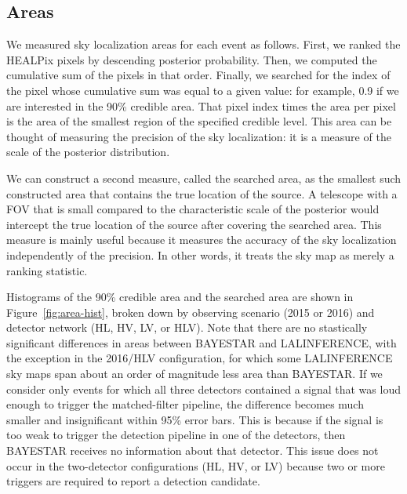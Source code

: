 \documentclass[amsmath,amssymb,aps,prx,reprint,nopreprintnumbers,nofootinbib]{revtex4-1}
\begin{document}
\subsection{Areas}

We measured sky localization areas for each event as follows. First, we ranked the \ac{HEALPix} pixels by descending posterior probability. Then, we computed the cumulative sum of the pixels in that order. Finally, we searched for the index of the pixel whose cumulative sum was equal to a given value: for example, 0.9 if we are interested in the 90\% credible area. That pixel index times the area per pixel is the area of the smallest region of the specified credible level. This area can be thought of measuring the precision of the sky localization: it is a measure of the scale of the posterior distribution.

We can construct a second measure, called the searched area, as the smallest such constructed area that contains the true location of the source. A telescope with a \ac{FOV} that is small compared to the characteristic scale of the posterior would intercept the true location of the source after covering the searched area. This measure is mainly useful because it measures the accuracy of the sky localization independently of the precision. In other words, it treats the sky map as merely a ranking statistic.

Histograms of the 90\% credible area and the searched area are shown in Figure~\ref{fig:area-hist}, broken down by observing scenario (2015 or 2016) and detector network (HL, HV, LV, or HLV). Note that there are no stastically significant differences in areas between \ac{BAYESTAR} and LALINFERENCE, with the exception in the 2016/HLV configuration, for which some LALINFERENCE sky maps span about an order of magnitude less area than \ac{BAYESTAR}. If we consider only events for which all three detectors contained a signal that was loud enough to trigger the matched\nobreakdashes-filter pipeline, the difference becomes much smaller and insignificant within 95\% error bars. This is because if the signal is too weak to trigger the detection pipeline in one of the detectors, then \ac{BAYESTAR} receives no information about that detector. This issue does not occur in the two\nobreakdashes-detector configurations (HL, HV, or LV) because two or more triggers are required to report a detection candidate.
\end{document}
